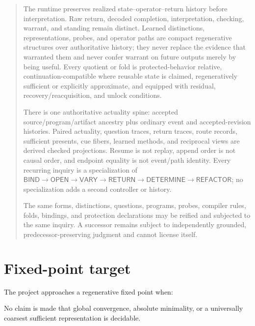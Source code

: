 \documentclass[11pt,oneside]{article}
\begin{document}
\begin{quote}
The runtime preserves realized state--operator--return history before interpretation.  Raw return, decoded completion, interpretation, checking, warrant, and standing remain distinct.  Learned distinctions, representations, probes, and operator paths are compact regenerative structures over authoritative history; they never replace the evidence that warranted them and never confer warrant on future outputs merely by being useful.  Every quotient or fold is protected-behavior relative, continuation-compatible where reusable state is claimed, regeneratively sufficient or explicitly approximate, and equipped with residual, recovery/reacquisition, and unlock conditions.

There is one authoritative actuality spine: accepted source/program/artifact ancestry plus ordinary
event and accepted-revision histories.  Paired actuality, question traces, return traces, route
records, sufficient presents, cue fibers, learned methods, and reciprocal views are derived checked
projections.  Resume is not replay, append order is not causal order, and endpoint equality is not
event/path identity.  Every recurring inquiry is a specialization of
\(\mathsf{BIND}\to\mathsf{OPEN}\to\mathsf{VARY}\to\mathsf{RETURN}\to
\mathsf{DETERMINE}\to\mathsf{REFACTOR}\); no specialization adds a second controller or history.

The same forms, distinctions, questions, programs, probes, compiler rules, folds, bindings, and protection declarations may be reified and subjected to the same inquiry.  A successor remains subject to independently grounded, predecessor-preserving judgment and cannot license itself.
\end{quote}

\section{Fixed-point target}

The project approaches a regenerative fixed point when:
\begin{center}
\end{center}
No claim is made that global convergence, absolute minimality, or a universally coarsest sufficient representation is decidable.
\end{document}
